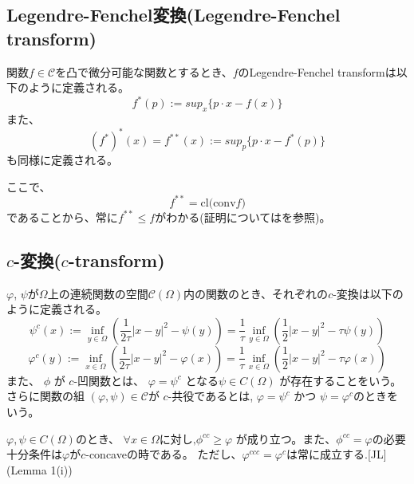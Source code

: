\subsection{Legendre-Fenchel変換(Legendre-Fenchel transform)}
\label{sect:Legendre-Fenchel変換(Legendre-Fenchel transform)}
\begin{dfn}
    関数$f \in \mathcal{C}$を凸で微分可能な関数とするとき、$f$のLegendre-Fenchel transformは以下のように定義される。
    \begin{equation}
        f^*(p) := sup_x\{p \cdot x - f(x) \} 
    \end{equation}
    また、
    \begin{equation}
        (f^*)^*(x) = f^{**} (x) := sup_p\{p \cdot x - f^*(p) \}
    \end{equation}
    も同様に定義される。
\end{dfn}
ここで、
\[
    f^{**} = \text{cl(conv} f)  
\]
であることから、常に$f^{**} \le f$がわかる(証明については\cite[Thm. 11.1(p474)]{MR1491362}を参照)。

\subsection{$c$-変換($c$-transform)}
\label{sect:c-変換(c-transform)}
\begin{dfn}
    $\varphi$, $\psi$が$\Omega$上の連続関数の空間$\mathcal{C}(\Omega)$内の関数のとき、それぞれの$c$-変換は以下のように定義される。
    \begin{equation}
        \label{dfn:backward-c-transform}
        \psi^c(x) := \inf_{y \in \Omega} \left( \frac{1}{2\tau}|x-y|^2 - \psi(y)\right) = \frac{1}{\tau}\inf_{y \in \Omega} \left( \frac{1}{2}|x-y|^2 - \tau\psi(y)\right)
    \end{equation}
    \begin{equation}
        \label{dfn:forward-c-transform}
        \varphi^c(y) := \inf_{x \in \Omega} \left( \frac{1}{2\tau}|x-y|^2 - \varphi(x)\right) = \frac{1}{\tau}\inf_{x \in \Omega} \left( \frac{1}{2}|x-y|^2 - \tau\varphi(x)\right)
    \end{equation}
    また、 $\phi$ が $c$-凹関数とは、 $\varphi = \psi^c$ となる$\psi \in C(\Omega)$ が存在することをいう。
    さらに関数の組 $(\varphi, \psi) \in \mathcal{C}$が $c$-共役であるとは, $\varphi = \psi^c$ かつ $\psi = \varphi^c$のときをいう。
\end{dfn}


\begin{lem}
    \label{lem:c-transform}
    $\varphi, \psi \in C(\Omega)$のとき、
    $\forall x \in \Omega \text{に対し,}\phi^{cc} \ge \varphi$
    が成り立つ。また、$\phi^{cc} = \varphi$の必要十分条件は$\varphi$が$c$-concaveの時である。
    ただし、$\varphi^{ccc} = \varphi^c$は常に成立する.[JL](Lemma 1(i))
\end{lem}


